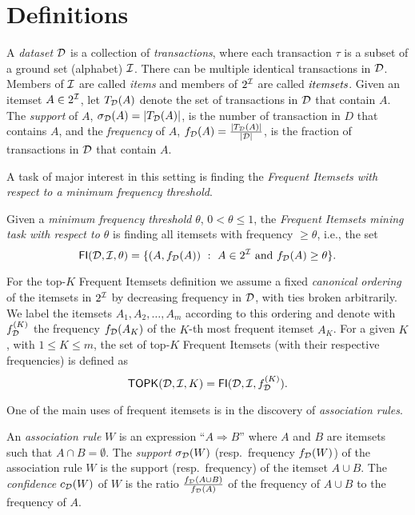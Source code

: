 \section{Definitions}
\label{sec:def}

A \emph{dataset} ${\cal D}$ is a collection of \emph{transactions}, where each
transaction $\tau$ is a subset of a ground set (alphabet) ${\cal I}$. There can
be multiple identical transactions in ${\cal D}$. Members of ${\cal I}$ are called
\emph{items} and members of $2^{\cal I}$ are called $\emph{itemsets}$.
Given an itemset
$A \in 2^{{\cal I}}$,  let $T_{\cal D}(A)$ denote the set of
transactions in ${\cal D}$ that contain $A$. The \emph{support} of $A$,
$\sigma_{\cal D}(A) =|T_{\cal D}(A)|$, is the number of transaction in $D$ that contains
$A$, and the \emph{frequency} of $A$, $f_{\cal D}(A)= \frac{|T_{\cal D}(A)|}{|{\cal D}|}$, is the fraction of
transactions in ${\cal D}$ that contain $A$.

A task of major interest in this setting is finding the \emph{Frequent
Itemsets with respect to a minimum frequency threshold}.

\begin{definition}\label{def:minethreshold}
  Given a \emph{minimum frequency threshold} $\theta$, $0<\theta\le 1$, the 
  \emph{Frequent Itemsets mining task with respect to $\theta$} is finding all itemsets with
  frequency $\geq\theta$, i.e., the set
  \[
\mathsf{FI}({\cal D},{\cal I},\theta)=\{(A,f_{\cal D}(A)) ~:~ A \in 2^{\cal I} \mbox{ and } f_{{\cal D}}(A)\ge
\theta\}.
\] 
\end{definition}

For the top-$K$ Frequent Itemsets definition we assume a fixed \textit{canonical ordering} of
the itemsets in $2^{\cal I}$ by decreasing frequency in ${\cal D}$, with ties broken
arbitrarily. We label the itemsets $A_1,A_2,\dotsc,A_m$ according
to this ordering and denote with $f^{(K)}_{\cal D}$ the frequency $f_{\cal D}(A_K)$ of
the $K$-th most frequent itemset $A_K$. For a given $K$, with $1 \leq K \leq m$,
the set of top-$K$ Frequent Itemsets (with their respective frequencies) is
defined as
  \begin{equation}\label{eq:topkdef}
    \mathsf{TOPK}({\cal D},{\cal I},K)= \mathsf{FI}({\cal D},{\cal I},f^{(K)}_{\cal D}).
  \end{equation}

One of the main uses of frequent itemsets is in the discovery of
\emph{association rules}.

\begin{definition}\label{def:ar}
  An \emph{association rule} $W$ is an expression ``$A\Rightarrow B$'' where $A$
  and $B$ are itemsets such that $A\cap B=\emptyset$. The \emph{support}
  $\sigma_{\cal D}(W)$ (resp.~frequency $f_{\cal D}(W)$) of the association rule
  $W$ is the support (resp.~frequency) of the
  itemset $A\cup B$. The \emph{confidence} $c_{\cal D}(W)$ of $W$ is the ratio
  $\frac{f_{\cal D}(A \cup B)}{f_{\cal D}(A)}$ of the frequency of $A\cup B$ to the
  frequency of $A$. 
\end{definition}


